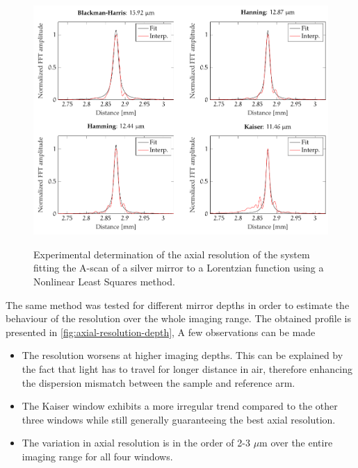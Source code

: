 \begin{figure}[hbt]
	{\myfloatalign
		\includegraphics[width=\linewidth]{gfx/tikz/axial_resolution}}
	\caption{Experimental determination of the axial resolution of the system fitting the A-scan of a silver mirror to a Lorentzian function using a Nonlinear Least Squares method.}\label{fig:axial-resolution}
\end{figure}

The same method was tested for different mirror depths in order to estimate the behaviour of the resolution over the whole imaging range. The obtained profile is presented in \autoref{fig:axial-resolution-depth}, A few observations can be made
\begin{itemize}
	\item The resolution worsens at higher imaging depths. This can be explained by the fact that light has to travel for longer distance in air, therefore enhancing the dispersion mismatch between the sample and reference arm. 
	
	\item The Kaiser window exhibits a more irregular trend compared to the other three windows while still generally guaranteeing the best axial resolution. 
	
	\item The variation in axial resolution is in the order of 2-3 $\mu$m over the entire imaging range for all four windows. 
\end{itemize}

